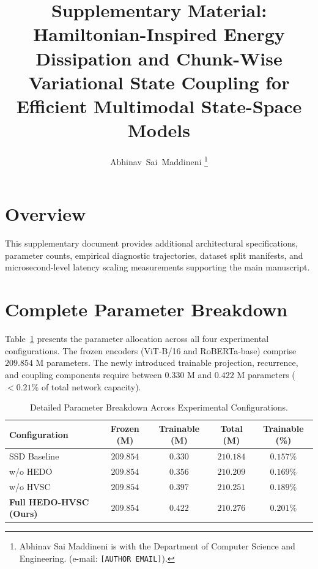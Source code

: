 \documentclass[journal]{IEEEtran}
\begin{document}
\title{Supplementary Material:\\Hamiltonian-Inspired Energy Dissipation and Chunk-Wise Variational State Coupling for Efficient Multimodal State-Space Models}

\author{Abhinav~Sai~Maddineni%
\thanks{Abhinav Sai Maddineni is with the Department of Computer Science and Engineering. (e-mail: \texttt{[AUTHOR EMAIL]}).}%
}

\maketitle

\section{Overview}
This supplementary document provides additional architectural specifications, parameter counts, empirical diagnostic trajectories, dataset split manifests, and microsecond-level latency scaling measurements supporting the main manuscript.

\section{Complete Parameter Breakdown}
Table~\ref{tab:supp_params} presents the parameter allocation across all four experimental configurations. The frozen encoders (ViT-B/16 and RoBERTa-base) comprise $209.854\text{ M}$ parameters. The newly introduced trainable projection, recurrence, and coupling components require between $0.330\text{ M}$ and $0.422\text{ M}$ parameters ($<0.21\%$ of total network capacity).

\begin{table}[h]
\centering
\caption{Detailed Parameter Breakdown Across Experimental Configurations.}
\label{tab:supp_params}
\begin{tabular}{lcccc}
\toprule
\textbf{Configuration} & \textbf{Frozen (M)} & \textbf{Trainable (M)} & \textbf{Total (M)} & \textbf{Trainable (\%)} \\
\midrule
SSD Baseline & $209.854$ & $0.330$ & $210.184$ & $0.157\%$ \\
w/o HEDO & $209.854$ & $0.356$ & $210.209$ & $0.169\%$ \\
w/o HVSC & $209.854$ & $0.397$ & $210.251$ & $0.189\%$ \\
\textbf{Full HEDO-HVSC (Ours)} & $209.854$ & $\mathbf{0.422}$ & $\mathbf{210.276}$ & $\mathbf{0.201\%}$ \\
\bottomrule
\end{tabular}
\end{table}
\end{document}
